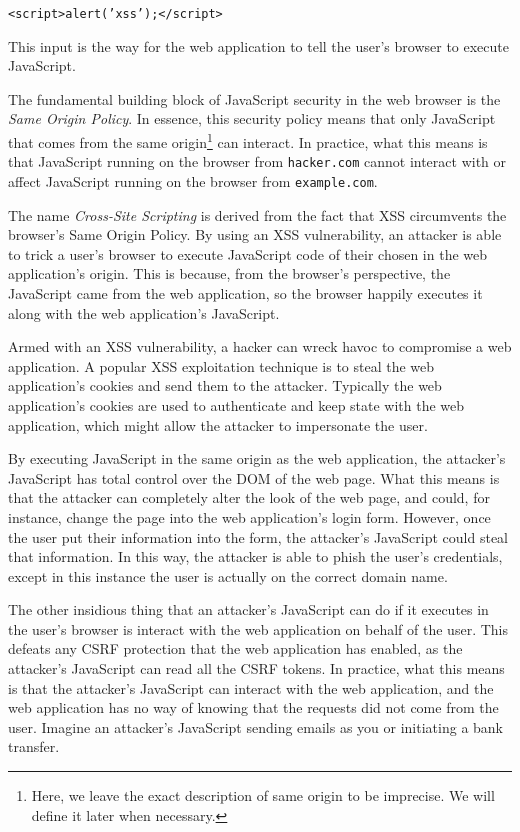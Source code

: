 \texttt{<script>alert('xss');</script>}

This input is the way for the web application to tell the user's
browser to execute JavaScript. 

The fundamental building block of JavaScript security in the web
browser is the \emph{Same Origin Policy}. In essence, this security
policy means that only JavaScript that comes from the same
origin\footnote{Here, we leave the exact description of same origin to
  be imprecise. We will define it later when necessary.} can interact.
In practice, what this means is that JavaScript running on the browser
from \texttt{hacker.com} cannot interact with or affect JavaScript
running on the browser from \texttt{example.com}.

The name \emph{Cross-Site Scripting} is derived from the fact that XSS
circumvents the browser's Same Origin Policy. By using an XSS
vulnerability, an attacker is able to trick a user's browser to
execute JavaScript code of their chosen in the web application's
origin. This is because, from the browser's perspective, the
JavaScript came from the web application, so the browser happily
executes it along with the web application's JavaScript.

Armed with an XSS vulnerability, a hacker can wreck havoc to
compromise a web application. A popular XSS exploitation technique is
to steal the web application's cookies and send them to the attacker.
Typically the web application's cookies are used to authenticate and
keep state with the web application, which might allow the attacker to
impersonate the user. 

By executing JavaScript in the same origin as the web application, the
attacker's JavaScript has total control over the DOM of the web page.
What this means is that the attacker can completely alter the look of
the web page, and could, for instance, change the page into the web
application's login form. However, once the user put their information
into the form, the attacker's JavaScript could steal that information.
In this way, the attacker is able to phish the user's credentials,
except in this instance the user is actually on the correct domain
name.

The other insidious thing that an attacker's JavaScript can do if it
executes in the user's browser is interact with the web application on
behalf of the user. This defeats any CSRF protection that the web
application has enabled, as the attacker's JavaScript can read all the
CSRF tokens. In practice, what this means is that the attacker's
JavaScript can interact with the web application, and the web
application has no way of knowing that the requests did not come from
the user. Imagine an attacker's JavaScript sending emails as you or
initiating a bank transfer.

